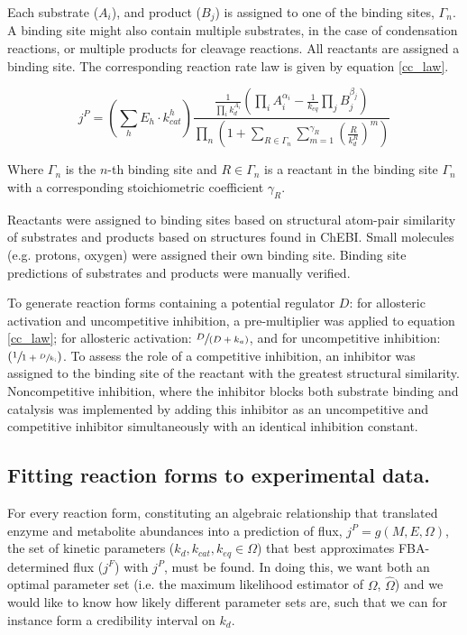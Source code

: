 Each substrate ($A_{i}$), and product ($B_{j}$) is assigned to one of the binding sites, $\Gamma_{n}$. A binding site might also contain multiple substrates, in the case of condensation reactions, or multiple products for cleavage reactions. All reactants are assigned a binding site. The corresponding reaction rate law is given by equation \ref{cc_law}.

\begin{equation}
j^{P} = \left(\sum_{h}E_{h} \cdot k^{h}_{cat}\right)\frac{\frac{1}{\prod_{i}k_{d}^{A_{i}}}\left(\prod_{i}A_{i}^{\alpha_{i}} - \frac{1}{k_{eq}} \prod_{j}B_{j}^{\beta_{j}}\right)}{\prod_{n}\left(1 + \sum_{R \in \Gamma_{n}} \sum_{m = 1}^{\gamma_{R}}\left(\frac{R}{k_{d}^{R}}\right)^{m} \right)}\label{cc_law}
\end{equation}

Where $\Gamma_{n}$ is the $n$-th binding site and $R \in \Gamma_{n}$ is a reactant in the binding site $\Gamma_{n}$ with a corresponding stoichiometric coefficient $\gamma_{R}$.

Reactants were assigned to binding sites based on structural atom-pair similarity of substrates and products \cite{Cao:2008fa} based on structures found in ChEBI.  Small molecules (e.g. protons, oxygen) were assigned their own binding site.  Binding site predictions of substrates and products were manually verified.

To generate reaction forms containing a potential regulator $D$: for allosteric activation and uncompetitive inhibition, a pre-multiplier was applied to equation \ref{cc_law}; for allosteric activation: $\sfrac{D}{(D + k_{a})}$, and for uncompetitive inhibition: $(\sfrac{1}{1 + \sfrac{D}{k_{i}}})$.  To assess the role of a competitive inhibition, an inhibitor was assigned to the binding site of the reactant with the greatest structural similarity.  Noncompetitive inhibition, where the inhibitor blocks both substrate binding and catalysis was implemented by adding this inhibitor as an uncompetitive and competitive inhibitor simultaneously with an identical inhibition constant.  

\subsection{Fitting reaction forms to experimental data.}

For every reaction form, constituting an algebraic relationship that translated enzyme and metabolite abundances into a prediction of flux, $j^{P} = g(M, E, \Omega)$, the set of kinetic parameters ($k_{d}, k_{cat}, k_{eq} \in \Omega$) that best approximates FBA-determined flux ($j^{F}$) with $j^{P}$, must be found.  In doing this, we want both an optimal parameter set (i.e. the maximum likelihood estimator of $\Omega$, $\hat{\Omega}$) and we would like to know how likely different parameter sets are, such that we can for instance form a credibility interval on $k_{d}$.

